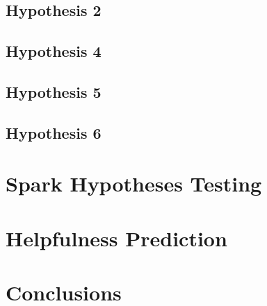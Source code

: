 \documentclass{class}
\begin{document}
\begin{multicols}{2}
    \subsection*{Hypothesis 2}
    
    \subsection*{Hypothesis 4}
    \subsection*{Hypothesis 5}
    \subsection*{Hypothesis 6}
    \section{Spark Hypotheses Testing}
    \section{Helpfulness Prediction}
    \section{Conclusions}

\end{multicols}
\end{document}
